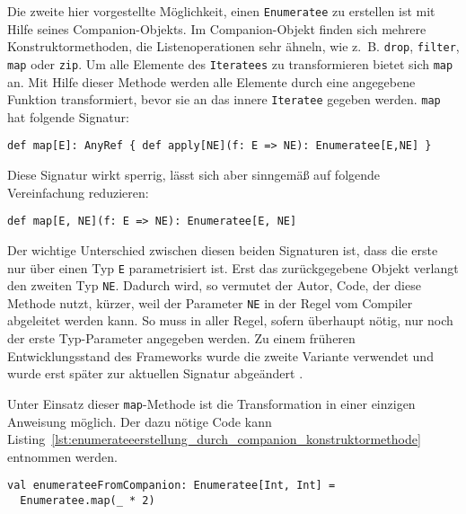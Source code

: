 \documentclass[draft=false
              ,paper=a4
              ,twoside=false
              ,fontsize=11pt
              ,headsepline
              ,BCOR10mm
              ,DIV11
              ]{scrbook}
\begin{document}
Die zweite hier vorgestellte Möglichkeit, einen \lstinline|Enumeratee| zu erstellen ist mit Hilfe seines Companion-Objekts.
Im Companion-Objekt finden sich mehrere Konstruktormethoden, die Listenoperationen sehr ähneln, wie z.~B. \lstinline|drop|, \lstinline|filter|, \lstinline|map| oder \lstinline|zip|.
Um alle Elemente des \lstinline|Iteratees| zu transformieren bietet sich \lstinline|map| an.
Mit Hilfe dieser Methode werden alle Elemente durch eine angegebene Funktion transformiert, bevor sie an das innere \lstinline|Iteratee| gegeben werden.
\lstinline|map| hat folgende Signatur:
\begin{lstlisting}
def map[E]: AnyRef { def apply[NE](f: E => NE): Enumeratee[E,NE] }
\end{lstlisting}
Diese Signatur wirkt sperrig, lässt sich aber sinngemäß auf folgende Vereinfachung reduzieren:
\begin{lstlisting}
def map[E, NE](f: E => NE): Enumeratee[E, NE]
\end{lstlisting}

Der wichtige Unterschied zwischen diesen beiden Signaturen ist, dass die erste nur über einen Typ \lstinline|E| parametrisiert ist.
Erst das zurückgegebene Objekt verlangt den zweiten Typ \lstinline|NE|.
Dadurch wird, so vermutet der Autor, Code, der diese Methode nutzt, kürzer, weil der Parameter \lstinline|NE| in der Regel vom Compiler abgeleitet werden kann.
So muss in aller Regel, sofern überhaupt nötig, nur noch der erste Typ-Parameter angegeben werden.
Zu einem früheren Entwicklungsstand des Frameworks wurde die zweite Variante verwendet und wurde erst später zur aktuellen Signatur abgeändert \cite[vgl.][]{play_enumeratee_map_signatur}.

Unter Einsatz dieser \lstinline|map|-Methode ist die Transformation in einer einzigen Anweisung möglich.
Der dazu nötige Code kann Listing~\ref{lst:enumerateeerstellung_durch_companion_konstruktormethode} entnommen werden.

\begin{lstlisting}[caption=Erstellung eines Enumeratees durch die map-Konstruktormethode, label=lst:enumerateeerstellung_durch_companion_konstruktormethode]
val enumerateeFromCompanion: Enumeratee[Int, Int] =
  Enumeratee.map(_ * 2)
\end{lstlisting}


\end{document}
